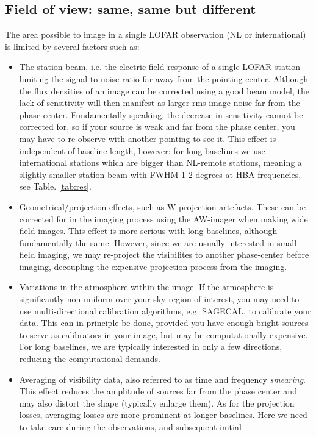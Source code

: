 \subsection{Field of view: same, same but different}
The area possible to image in a single LOFAR observation (NL or international) is limited
by several factors such as: 
\begin{itemize}
\item The station beam, i.e. the electric field response of a single LOFAR
station limiting the signal to noise ratio far away from the pointing center.
Although the flux densities of an image can be corrected using a good beam
model, the lack of sensitivity will then manifest as larger rms image noise far
from the phase center. Fundamentally speaking, the decrease in sensitivity
cannot be corrected for, so if your source is weak and far from the phase
center, you may have to re-observe with another pointing to see it.  This
effect is independent of baseline length, however: for long baselines we use
international stations which are bigger than NL-remote stations, meaning a
slightly smaller station beam with FWHM 1-2 degrees at HBA frequencies, see
Table. \ref{tab:res}. 
\item Geometrical/projection effects, such as W-projection artefacts. These can
be corrected for in the imaging process using the AW-imager when making wide
field images. This effect is more serious with long baselines, although
fundamentally the same. However, since we are usually interested in small-field
imaging, we may re-project the visibilites to another phase-center before
imaging, decoupling the expensive projection process from the imaging. 
\item Variations in the atmosphere within the image. If the atmosphere is
significantly non-uniform over your sky region of interest, you may need to use
multi-directional calibration algorithms, e.g. SAGECAL, to calibrate your data.
This can in principle be done, provided you have enough bright sources to serve
as calibrators in your image, but may be computationally expensive. For long
baselines, we are typically interested in only a few directions, reducing the
computational demands.
\item Averaging of visibility data, also referred to as time and frequency
\emph{smearing}. This effect reduces the amplitude of sources far from the
phase center and may also distort the shape (typically enlarge them). As for
the projection losses, averaging losses are more prominent at longer baselines.
Here we need to take care during the observations, and subsequent initial

\end{itemize}
